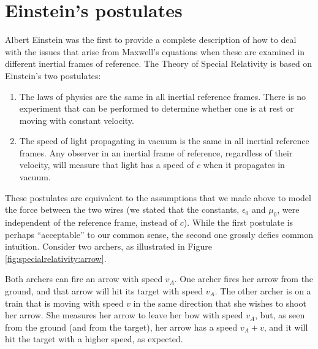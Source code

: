 \section{Einstein's postulates}
Albert Einstein was the first to provide a complete description of how to deal with the issues that arise from Maxwell's equations when these are examined in different inertial frames of reference. The Theory of Special Relativity is based on Einstein's two postulates:
\begin{enumerate}
\item The laws of physics are the same in all inertial reference frames. There is no experiment that can be performed to determine whether one is at rest or moving with constant velocity.
\item The speed of light propagating in vacuum is the same in all inertial reference frames. Any observer in an inertial frame of reference, regardless of their velocity, will measure that light has a speed of $c$ when it propagates in vacuum. 
\end{enumerate}
These postulates are equivalent to the assumptions that we made above to model the force between the two wires (we stated that the constants, $\epsilon_0$ and $\mu_0$, were independent of the reference frame, instead of $c$). While the first postulate is perhaps ``acceptable'' to our common sense, the second one grossly defies common intuition. Consider two archers, as illustrated in Figure \ref{fig:specialrelativity:arrow}.

Both archers can fire an arrow with speed $v_A$. One archer fires her arrow from the ground, and that arrow will hit its target with speed $v_A$. The other archer is on a train that is moving with speed $v$ in the same direction that she wishes to shoot her arrow. She measures her arrow to leave her bow with speed $v_A$, but, as seen from the ground (and from the target), her arrow has a speed $v_A+v$, and it will hit the target with a higher speed, as expected.

